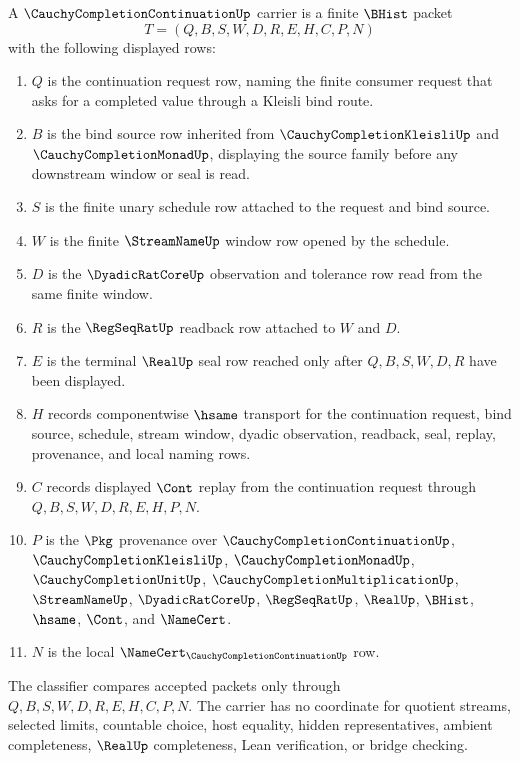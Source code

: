 \begin{definition}
\label{def:cauchy-completion-continuation-carrier}
A $\CauchyCompletionContinuationUp$ carrier is a finite $\BHist$ packet
$$
T=(Q,B,S,W,D,R,E,H,C,P,N)
$$
with the following displayed rows:
\begin{enumerate}
\item $Q$ is the continuation request row, naming the finite consumer request that asks for a completed value through a Kleisli bind route.
\item $B$ is the bind source row inherited from $\CauchyCompletionKleisliUp$ and $\CauchyCompletionMonadUp$, displaying the source family before any downstream window or seal is read.
\item $S$ is the finite unary schedule row attached to the request and bind source.
\item $W$ is the finite $\StreamNameUp$ window row opened by the schedule.
\item $D$ is the $\DyadicRatCoreUp$ observation and tolerance row read from the same finite window.
\item $R$ is the $\RegSeqRatUp$ readback row attached to $W$ and $D$.
\item $E$ is the terminal $\RealUp$ seal row reached only after $Q,B,S,W,D,R$ have been displayed.
\item $H$ records componentwise $\hsame$ transport for the continuation request, bind source, schedule, stream window, dyadic observation, readback, seal, replay, provenance, and local naming rows.
\item $C$ records displayed $\Cont$ replay from the continuation request through $Q,B,S,W,D,R,E,H,P,N$.
\item $P$ is the $\Pkg$ provenance over $\CauchyCompletionContinuationUp$, $\CauchyCompletionKleisliUp$, $\CauchyCompletionMonadUp$, $\CauchyCompletionUnitUp$, $\CauchyCompletionMultiplicationUp$, $\StreamNameUp$, $\DyadicRatCoreUp$, $\RegSeqRatUp$, $\RealUp$, $\BHist$, $\hsame$, $\Cont$, and $\NameCert$.
\item $N$ is the local $\NameCert_{\CauchyCompletionContinuationUp}$ row.
\end{enumerate}
The classifier compares accepted packets only through $Q,B,S,W,D,R,E,H,C,P,N$. The carrier has no coordinate for quotient streams, selected limits, countable choice, host equality, hidden representatives, ambient completeness, $\RealUp$ completeness, Lean verification, or bridge checking.
\end{definition}

